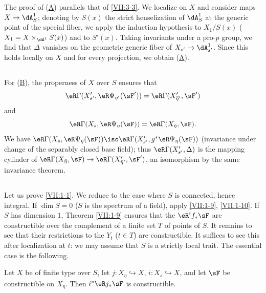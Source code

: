 The proof of (\hyperlink{VII:3-A}{A}) parallels that of \ref{VII:3-3}. We
localize on $X$ and consider maps $X\to \dA_S^1$; denoting by $S(x)$ the
strict henselization of $\dA_S^1$ at the generic point of the special fiber,
we apply the induction hypothesis to $X_1/S(x)$
($X_1=X\times_{\dA^1} S(x)$) and to $S'(x)$. Taking invariants under a pro-$p$
group, we find that $\Delta$ vanishes on the geometric generic fiber of
$X_{s'} \to \dA_{s'}^1$. Since this holds locally on $X$ and for every
projection, we obtain (\hyperlink{VII:3-A}{A}).






\subsection{}\label{VII:3-9}

For (\hyperlink{VII:3-B}{B}), the properness of $X$ over $S$ ensures that
\[
  \eR\Gamma(X_{s'}',\eR\Psi_{\eta'}(\sF')) = \eR\Gamma(X_{\bar\eta'}',\sF') 
\]
and
\[
  \eR\Gamma(X_s,\eR\Psi_\eta(\sF)) = \eR\Gamma(X_{\bar\eta},\sF) \text{.} 
\]
We have
$\eR\Gamma(X_s,\eR\Psi_\eta(\sF))\iso \eR\Gamma(X_{s'}',g^\ast\eR\Psi_\eta(\sF))$
(invariance under change of the separably closed base field); thus
$\eR\Gamma(X_{s'}', \Delta)$ is the mapping cylinder of
$\eR\Gamma(X_{\bar\eta},\sF) \to \eR\Gamma(X_{\bar\eta'}',\sF')$, an
isomorphism by the same invariance theorem.






\subsection{}\label{VII:3-10}

Let us prove \ref{VII:1-1}. We reduce to the case where $S$ is connected,
hence integral. If $\dim S=0$ ($S$ is the spectrum of a field), apply
\ref{VII:1-9}, \ref{VII:1-10}. If $S$ has dimension $1$, Theorem
\ref{VII:1-9} ensures that the $\eR^i f_\ast \sF$ are constructible over the
complement of a finite set $T$ of points of $S$. It remains to see that their
restrictions to the $Y_t$ ($t\in T$) are constructible. It suffices to see
this after localization at $t$: we may assume that $S$ is a strictly local
trait. The essential case is the following.






\begin{lemma_}\label{VII:3-11}
Let $X$ be of finite type over $S$, let $j:X_\eta\hookrightarrow X$,
$i:X_s\hookrightarrow X$, and let $\sF$ be constructible on $X_\eta$. Then
$i^\ast\eR j_\ast \sF$ is constructible.
\end{lemma_}

